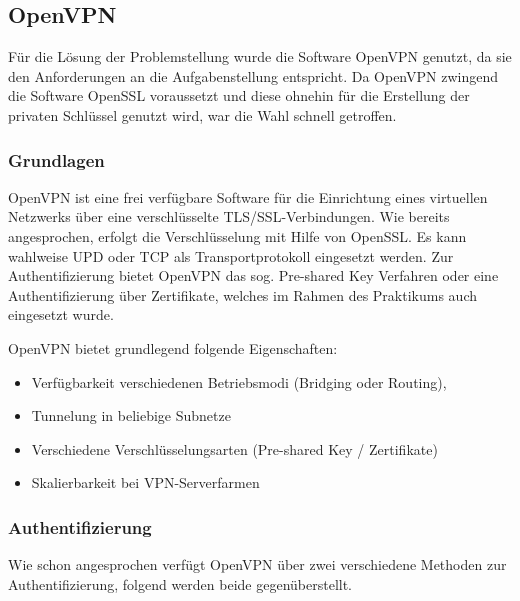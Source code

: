 \documentclass[
a4paper,     %
 headsepline, %
footsepline, %
titlepage,   %
 halfparskip,     %
 fleqn,       %
12pt         %
]{scrartcl}  %
\begin{document}
\subsection{OpenVPN}\label{openvpn}

Für die Lösung der Problemstellung wurde die Software OpenVPN genutzt, da sie den Anforderungen an die Aufgabenstellung entspricht. Da OpenVPN zwingend die Software OpenSSL voraussetzt und diese ohnehin für die Erstellung der privaten Schlüssel genutzt wird, war die Wahl schnell getroffen\cite{openV-1}. 

\subsubsection{Grundlagen}
OpenVPN ist eine frei verfügbare Software für die Einrichtung eines virtuellen Netzwerks über eine verschlüsselte TLS/SSL-Verbindungen. Wie bereits angesprochen, erfolgt die Verschlüsselung mit Hilfe von OpenSSL. Es kann wahlweise UPD oder TCP als Transportprotokoll eingesetzt werden. Zur Authentifizierung bietet OpenVPN das sog. Pre-shared Key Verfahren oder eine Authentifizierung über Zertifikate, welches im Rahmen des Praktikums auch eingesetzt wurde\cite{openV-1}. 

OpenVPN bietet grundlegend folgende Eigenschaften:

\begin{itemize}
\item Verfügbarkeit verschiedenen Betriebsmodi (Bridging oder Routing),
\item Tunnelung in beliebige Subnetze 
\item Verschiedene Verschlüsselungsarten (Pre-shared Key / Zertifikate)
\item Skalierbarkeit bei VPN-Serverfarmen
\end{itemize}

\subsubsection{Authentifizierung}
Wie schon angesprochen verfügt OpenVPN über zwei verschiedene Methoden zur Authentifizierung, folgend werden beide gegenüberstellt. 
\end{document}
